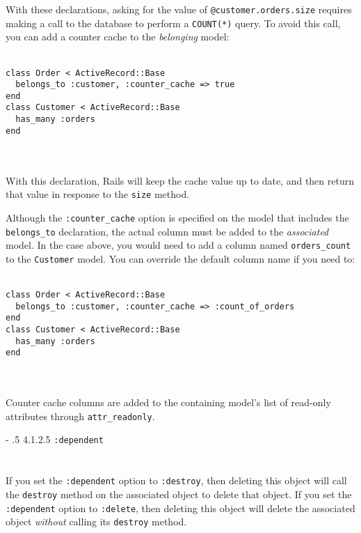 \documentclass[10pt]{book}
\makeatletter
\renewcommand\paragraph{%
   \@startsection{paragraph}{4}{0mm}%
      {-\baselineskip}%
      {.5\baselineskip}%
      {\normalfont\scriptsize\bfseries}}
\makeatother
\begin{document}
With these declarations, asking for the value of \texttt{@customer.orders.size} requires making a call to the database to perform a \texttt{COUNT(*)} query. To avoid this call, you can add a counter cache to the \emph{belonging} model:
\\ \\
\begin{minipage}{\textwidth}{\scriptsize
\begin{verbatim}
class Order < ActiveRecord::Base
  belongs_to :customer, :counter_cache => true
end
class Customer < ActiveRecord::Base
  has_many :orders
end
\end{verbatim}}
\end{minipage}
\\ \\

With this declaration, Rails will keep the cache value up to date, and then return that value in response to the \texttt{size} method.

Although the \texttt{:counter\_cache} option is specified on the model that includes the \texttt{belongs\_to} declaration, the actual column must be added to the \emph{associated} model. In the case above, you would need to add a column named \texttt{orders\_count} to the \texttt{Customer} model. You can override the default column name if you need to:
\\ \\
\begin{minipage}{\textwidth}{\scriptsize
\begin{verbatim}
class Order < ActiveRecord::Base
  belongs_to :customer, :counter_cache => :count_of_orders
end
class Customer < ActiveRecord::Base
  has_many :orders
end
\end{verbatim}}
\end{minipage}
\\ \\

Counter cache columns are added to the containing model’s list of read-only attributes through \texttt{attr\_readonly}.

\paragraph{4.1.2.5 \texttt{:dependent}}\\ \\\\

If you set the \texttt{:dependent} option to \texttt{:destroy}, then deleting this object will call the \texttt{destroy} method on the associated object to delete that object. If you set the \texttt{:dependent} option to \texttt{:delete}, then deleting this object will delete the associated object \emph{without} calling its \texttt{destroy} method.
\end{document}
